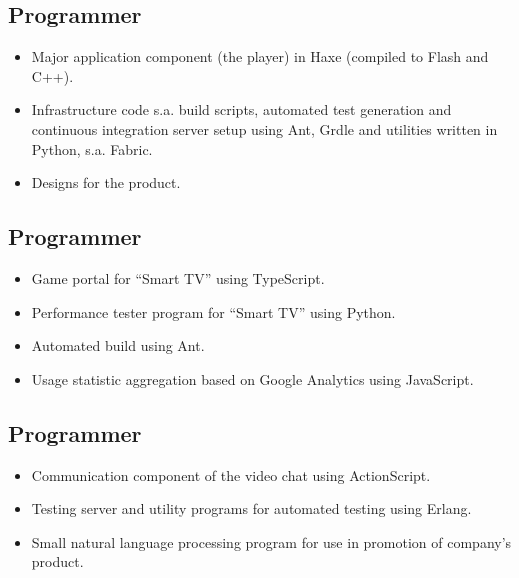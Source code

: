 \documentclass[11pt,sans]{moderncv}
\begin{document}
\subsection{Programmer}
\label{sec:orgheadline8}

\begin{itemize}
\item Major application component (the player) in Haxe (compiled to Flash and
C++).
\item Infrastructure code s.a. build scripts, automated test generation and
continuous integration server setup using Ant, Grdle and utilities written
in Python, s.a. Fabric.
\item Designs for the product.
\end{itemize}

\newpage

\subsection{Programmer}
\label{sec:orgheadline9}

\begin{itemize}
\item Game portal for ``Smart TV'' using TypeScript.
\item Performance tester program for ``Smart TV'' using Python.
\item Automated build using Ant.
\item Usage statistic aggregation based on Google Analytics using JavaScript.
\end{itemize}

\subsection{Programmer}
\label{sec:orgheadline10}

\begin{itemize}
\item Communication component of the video chat using ActionScript.
\item Testing server and utility programs for automated testing using Erlang.
\item Small natural language processing program for use in promotion of company's
product.
\end{itemize}
\end{document}
